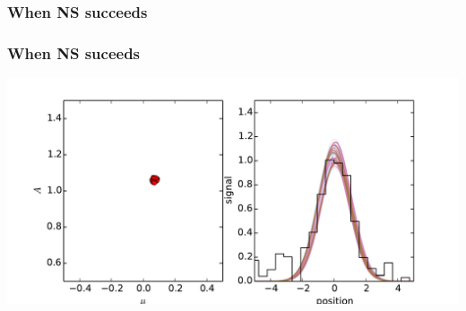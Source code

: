 \documentclass[]{beamer}
\begin{document}
\begin{frame}
  \frametitle{When NS succeeds} 
\end{frame}
\begin{frame}
  \frametitle{When NS suceeds} 
  \includegraphics[width=\textwidth]{movies/NS_1.pdf}
\end{frame}
\end{document}
